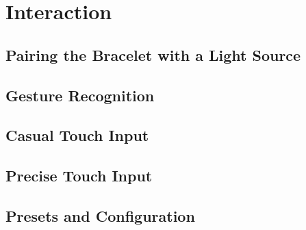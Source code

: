 \chapter{Interaction}

\section{Pairing the Bracelet with a Light Source}

\section{Gesture Recognition}

\section{Casual Touch Input}

\section{Precise Touch Input}

\section{Presets and Configuration}